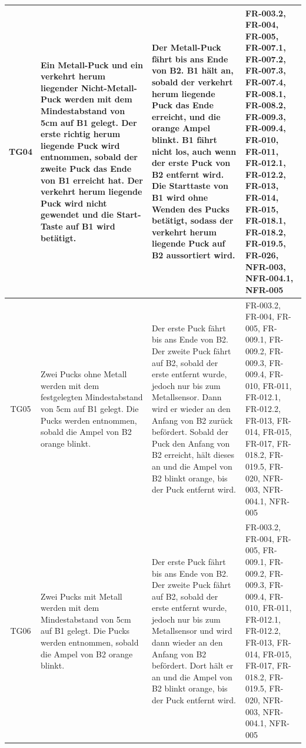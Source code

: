 \documentclass[oneside,a4paper,titlepage]{scrartcl}              %
\begin{document}
\begin{small}
\begin{center}
\begin{longtable}{|c|p{4cm}|p{6cm}|C{3cm}|}
      \hline
      TG04 & Ein Metall-Puck und ein verkehrt herum liegender Nicht-Metall-Puck werden mit dem Mindestabstand von 5cm auf B1 gelegt. Der erste richtig herum liegende Puck wird entnommen, sobald der zweite Puck das Ende von B1 erreicht hat. Der verkehrt herum liegende Puck wird nicht gewendet und die Start-Taste auf B1 wird betätigt. & Der Metall-Puck fährt bis ans Ende von B2. B1 hält an, sobald der verkehrt herum liegende Puck das Ende erreicht, und die orange Ampel blinkt. B1 fährt nicht los, auch wenn der erste Puck von B2 entfernt wird.
      Die Starttaste von B1 wird ohne Wenden des Pucks betätigt, sodass der verkehrt herum liegende Puck auf B2 aussortiert wird. & FR-003.2, FR-004, FR-005, FR-007.1, FR-007.2, FR-007.3, FR-007.4, FR-008.1, FR-008.2, FR-009.3, FR-009.4, FR-010, FR-011, FR-012.1, FR-012.2, FR-013, FR-014, FR-015, FR-018.1, FR-018.2, FR-019.5, FR-026, NFR-003, NFR-004.1, NFR-005\\
      \hline
       TG05 & Zwei Pucks ohne Metall werden mit dem festgelegten Mindestabstand von 5cm auf B1 gelegt. Die Pucks werden entnommen, sobald die Ampel von B2 orange blinkt.
       & Der erste Puck fährt bis ans Ende von B2. Der zweite Puck fährt auf B2, sobald der erste entfernt wurde, jedoch nur bis zum Metallsensor. Dann wird er wieder an den Anfang von B2 zurück befördert. Sobald der Puck den Anfang von B2 erreicht, hält dieses an und die Ampel von B2 blinkt orange, bis der Puck entfernt wird. & FR-003.2, FR-004, FR-005, FR-009.1, FR-009.2, FR-009.3, FR-009.4, FR-010, FR-011, FR-012.1, FR-012.2, FR-013, FR-014, FR-015, FR-017, FR-018.2, FR-019.5, FR-020, NFR-003, NFR-004.1, NFR-005\\
      \hline
      TG06 & Zwei Pucks mit Metall werden mit dem Mindestabstand von 5cm auf B1 gelegt. Die Pucks werden entnommen, sobald die Ampel von B2 orange blinkt. & Der erste Puck fährt bis ans Ende von B2. Der zweite Puck fährt auf B2, sobald der erste entfernt wurde, jedoch nur bis zum Metallsensor und wird dann wieder an den Anfang von B2 befördert. Dort hält er an und die Ampel von B2 blinkt orange, bis der Puck entfernt wird. & FR-003.2, FR-004, FR-005, FR-009.1, FR-009.2, FR-009.3, FR-009.4, FR-010, FR-011, FR-012.1, FR-012.2, FR-013, FR-014, FR-015, FR-017, FR-018.2, FR-019.5, FR-020, NFR-003, NFR-004.1, NFR-005\\
      \hline
    \end{longtable}
  \end{center}
\end{small}
\end{document}

